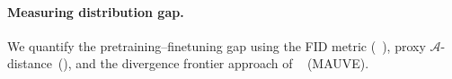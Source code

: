 \documentclass{article}
\begin{document}
\paragraph{Measuring distribution gap.}
We quantify the pretraining--finetuning gap using the FID metric (~\cite{parmar2022cleanfid}), proxy $\mathcal{A}$-distance~(\cite{bendavid2010theory}), and the divergence frontier approach of ~\cite{pillutla2021mauve, pillutla2023mauve} (MAUVE).



\end{document}

